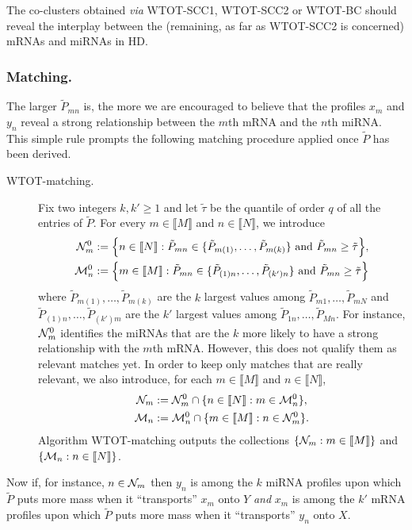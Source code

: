 The co-clusters  obtained \textit{via} WTOT-SCC1, WTOT-SCC2  or WTOT-BC should
reveal the interplay between the (remaining, as far as WTOT-SCC2 is concerned)
mRNAs and miRNAs in HD.


\subsubsection{Matching.}
\label{subsubsec:matching}

The larger $\tilde{P}_{mn}$ is, the more we are encouraged to believe that the
profiles $x_{m}$  and $y_{n}$ reveal  a strong relationship between  the $m$th
mRNA and  the $n$th miRNA.   This simple  rule prompts the  following matching
procedure applied once $\tilde{P}$ has been derived.

\begin{description}
\item[WTOT-matching.] Fix two integers $k,k' \geq 1$ and let $\tilde{\tau}$ be
  the quantile  of order  $q$ of  all the entries  of $\tilde{P}$.   For every
  $m \in \llbracket M\rrbracket$ and $n \in \llbracket N\rrbracket$, we introduce
  \begin{align*}
    \mathcal{N}_m^0
    &:=  \Big\{ n  \in  \llbracket N\rrbracket:  \tilde{P}_{mn} \in  \{  \tilde{P}_{m(1)}, \ldots,
      \tilde{P}_{m (k)} \} \textrm{ and } \tilde{P}_{mn}\geq \tilde{\tau} \Big \}, \\
    \mathcal{M}_n^0
    &:=  \Big \{  m  \in  \llbracket M\rrbracket: \tilde{P}_{mn}  \in  \{ \tilde{P}_{(1)n},  \ldots,
      \tilde{P}_{(k')n} \} \textrm{ and } \tilde{P}_{mn}\geq \tilde{\tau} \Big \} 
  \end{align*}
  where  $\tilde{P}_{m(1)}, \ldots,  \tilde{P}_{m (k)}$  are  the $k$  largest
  values     among     $\tilde{P}_{m1},      \ldots,     \tilde{P}_{mN}$     and
  $\tilde{P}_{(1)n},  \ldots, \tilde{P}_{(k')m}$  are  the  $k'$ largest  values
  among $\tilde{P}_{1n}, \ldots,  \tilde{P}_{Mn}$. For instance, $\mathcal{N}_{m}^{0}$
  identifies  the  miRNAs  that  are  the  $k$ more  likely  to  have  a  strong
  relationship with  the $m$th  mRNA.  However,  this does  not qualify  them as
  relevant matches yet. In order to  keep only matches that are really relevant,
  we also introduce, for each $m \in \llbracket M\rrbracket$ and $n \in \llbracket N\rrbracket$,
  \begin{align*}
    \mathcal{N}_m
    &:= \mathcal{N}^{0}_{m} \cap \{   n \in \llbracket N\rrbracket: m\in \mathcal{M}_n^0\},\\
    \mathcal{M}_n
    &:= \mathcal{M}^{0}_{n} \cap \{   m \in \llbracket M\rrbracket: n\in \mathcal{N}_m^0 \}.
  \end{align*}
  Algorithm WTOT-matching outputs the collections  $\{\mathcal{N}_{m} : m \in \llbracket M\rrbracket\}$
  and $\{\mathcal{M}_{n} : n \in \llbracket N\rrbracket\}$.
\end{description}
Now if, for  instance, $n \in \mathcal{N}_{m}$  then $y_{n}$ is among  the $k$ miRNA
profiles upon which $\tilde{P}$ puts  more mass when it ``transports'' $x_{m}$
onto  $Y$ \textit{and}  $x_{m}$ is  among the  $k'$ mRNA  profiles upon  which
$\tilde{P}$ puts more mass when it ``transports'' $y_{n}$ onto $X$.

